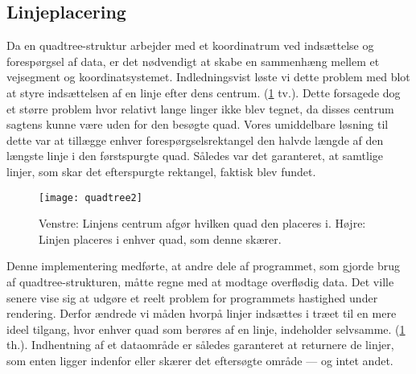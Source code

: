 \subsection{Linjeplacering}
Da en quadtree-struktur arbejder med et koordinatrum ved indsættelse og forespørgsel af data, er det nødvendigt at skabe en sammenhæng mellem et vejsegment og koordinatsystemet. Indledningsvist løste vi dette problem med blot at styre indsættelsen af en linje efter dens centrum. (\ref{fig:quadtree2} tv.). Dette forsagede dog et større problem hvor relativt lange linger ikke blev tegnet, da disses centrum sagtens kunne være uden for den besøgte quad. Vores umiddelbare løsning til dette var at tillægge enhver forespørgselsrektangel den halvde længde af den længste linje i den førstspurgte quad. Således var det garanteret, at samtlige linjer, som skar det efterspurgte rektangel, faktisk blev fundet.
\begin{figure}[ht]
	\centering
	\texttt{[image: quadtree2]}
	\captionsetup{width=0.8\textwidth}
	\caption{Venstre: Linjens centrum afgør hvilken quad den placeres i. Højre: Linjen placeres i enhver quad, som denne skærer.}
	\label{fig:quadtree2}
\end{figure}
Denne implementering medførte, at andre dele af programmet, som gjorde brug af quadtree-strukturen, måtte regne med at modtage overflødig data. Det ville senere vise sig at udgøre et reelt problem for programmets hastighed under rendering. Derfor ændrede vi måden hvorpå linjer indsættes i træet til en mere ideel tilgang, hvor enhver quad som berøres af en linje, indeholder selvsamme. (\ref{fig:quadtree2} th.). Indhentning af et dataområde er således garanteret at returnere de linjer, som enten ligger indenfor eller skærer det eftersøgte område --- og intet andet.

